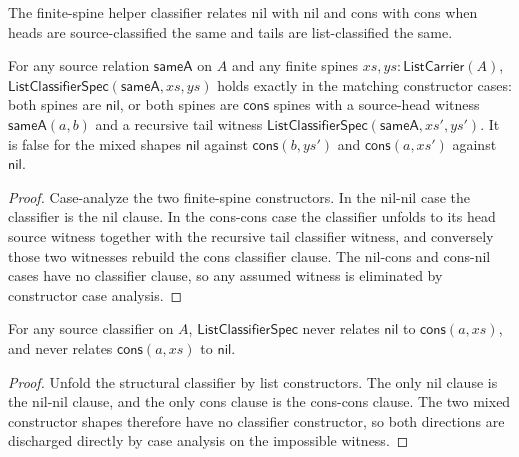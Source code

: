 \begin{definition}
\label{def:list-classifier-specification}
The finite-spine helper classifier relates nil with nil and cons with cons when heads are source-classified the same and tails are list-classified the same.
\end{definition}

\begin{theorem}
\label{thm:list-classifier-case-exactness}
For any source relation $\mathsf{sameA}$ on $A$ and any finite spines $xs,ys : \mathsf{ListCarrier}(A)$, $\mathsf{ListClassifierSpec}(\mathsf{sameA},xs,ys)$ holds exactly in the matching constructor cases: both spines are $\mathsf{nil}$, or both spines are $\mathsf{cons}$ spines with a source-head witness $\mathsf{sameA}(a,b)$ and a recursive tail witness $\mathsf{ListClassifierSpec}(\mathsf{sameA},xs',ys')$. It is false for the mixed shapes $\mathsf{nil}$ against $\mathsf{cons}(b,ys')$ and $\mathsf{cons}(a,xs')$ against $\mathsf{nil}$.
\end{theorem}
\begin{proof}
Case-analyze the two finite-spine constructors. In the nil-nil case the classifier is the nil clause. In the cons-cons case the classifier unfolds to its head source witness together with the recursive tail classifier witness, and conversely those two witnesses rebuild the cons classifier clause. The nil-cons and cons-nil cases have no classifier clause, so any assumed witness is eliminated by constructor case analysis.
\end{proof}

\begin{lemma}
\label{lem:list-classifier-nil-cons-no-confusion}
For any source classifier on $A$, $\mathsf{ListClassifierSpec}$ never relates
$\mathsf{nil}$ to $\mathsf{cons}(a,xs)$, and never relates
$\mathsf{cons}(a,xs)$ to $\mathsf{nil}$.
\end{lemma}
\begin{proof}
Unfold the structural classifier by list constructors. The only nil clause is
the nil-nil clause, and the only cons clause is the cons-cons clause. The two
mixed constructor shapes therefore have no classifier constructor, so both
directions are discharged directly by case analysis on the impossible witness.
\end{proof}

